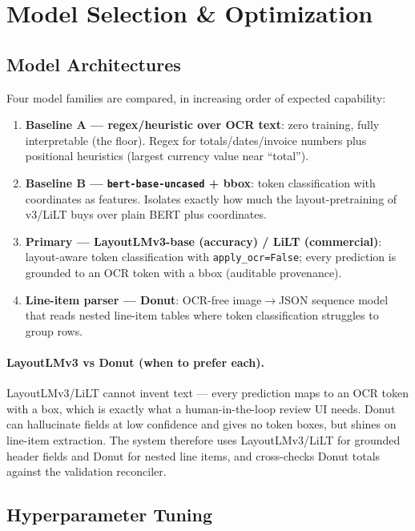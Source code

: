 \documentclass[12pt,a4paper]{article}
\begin{document}
\section{Model Selection \& Optimization}

\subsection{Model Architectures}

Four model families are compared, in increasing order of expected capability:
\begin{enumerate}
  \item \textbf{Baseline A --- regex/heuristic over OCR text}: zero training, fully interpretable (the floor). Regex for totals/dates/invoice numbers plus positional heuristics (largest currency value near ``total'').
  \item \textbf{Baseline B --- \texttt{bert-base-uncased} + bbox}: token classification with coordinates as features. Isolates exactly how much the layout-pretraining of v3/LiLT buys over plain BERT plus coordinates.
  \item \textbf{Primary --- LayoutLMv3-base (accuracy) / LiLT (commercial)}: layout-aware token classification with \texttt{apply\_ocr=False}; every prediction is grounded to an OCR token with a bbox (auditable provenance).
  \item \textbf{Line-item parser --- Donut}: OCR-free image$\to$JSON sequence model that reads nested line-item tables where token classification struggles to group rows.
\end{enumerate}

\paragraph{LayoutLMv3 vs Donut (when to prefer each).} LayoutLMv3/LiLT cannot invent
text --- every prediction maps to an OCR token with a box, which is exactly what a
human-in-the-loop review UI needs. Donut can hallucinate fields at low confidence and
gives no token boxes, but shines on line-item extraction. The system therefore uses
LayoutLMv3/LiLT for grounded header fields and Donut for nested line items, and
cross-checks Donut totals against the validation reconciler.

\subsection{Hyperparameter Tuning}
\end{document}
